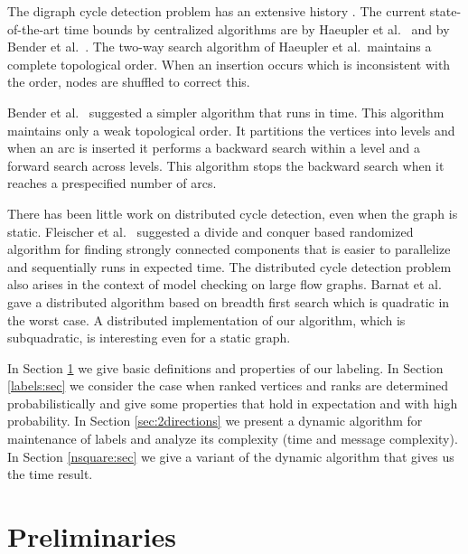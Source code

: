 \documentclass[11pt]{article}
\theoremstyle{plain}
\theoremstyle{definition}
\theoremstyle{remark}
\numberwithin{equation}{section}
\begin{document}
  The
  digraph cycle detection problem has an extensive history
  \cite{AlpernHRSZ90,Marchetti-SpaccamelaNR96,PearceK06,KatrielB06,LiuC07,AjwaniFM08,AjwaniF10,DBLP:journals/corr/abs-0711-0251,HKMST:Talg12,BFG:SODA09}.
    The current state-of-the-art
time bounds by centralized algorithms are   by Haeupler
 et al.\ \cite{HKMST:Talg12}
 and  by Bender  et al.\ \cite{BFG:SODA09}.
  The two-way search  algorithm of  Haeupler
 et al.\ maintains a complete topological order.
    When
an insertion occurs which is inconsistent with the order,  nodes are
shuffled to correct this.


 Bender et
al.\ \cite{BFG:SODA09} suggested a simpler algorithm that runs in
  time. This algorithm maintains only a
 weak topological order. It partitions
 the vertices  into levels and when an arc is inserted it performs a
 backward search within a level and a forward search across levels.
 This algorithm stops the backward search when it reaches a
prespecified number of arcs.


There has been little work on distributed cycle detection, even when
the graph is static. Fleischer et al.\ \cite{FleischerHP00}
suggested a divide and conquer based randomized algorithm for
finding strongly connected components that is easier to parallelize
and sequentially runs in expected  time. The distributed
cycle detection problem also arises in the context of model checking
on large flow graphs. Barnat et al.\ \cite{BarnatBC05} gave a
distributed algorithm based on breadth first search which is
quadratic in the worst case. A distributed implementation of our
algorithm, which is subquadratic, is interesting even for a static
graph.


\smallskip
{}

In Section \ref{prelim:sec} we give basic definitions and properties
of our labeling. In Section \ref{labels:sec} we consider the case
when ranked vertices and ranks are determined probabilistically and
give some properties that hold in expectation and with high
probability.
 In Section
\ref{sec:2directions} we present a dynamic algorithm for maintenance
of labels and analyze its complexity (time and message complexity).
In Section \ref{nsquare:sec} we give a variant of the dynamic
algorithm that gives us the  time result.


\section{Preliminaries} \label{prelim:sec}
\end{document}
